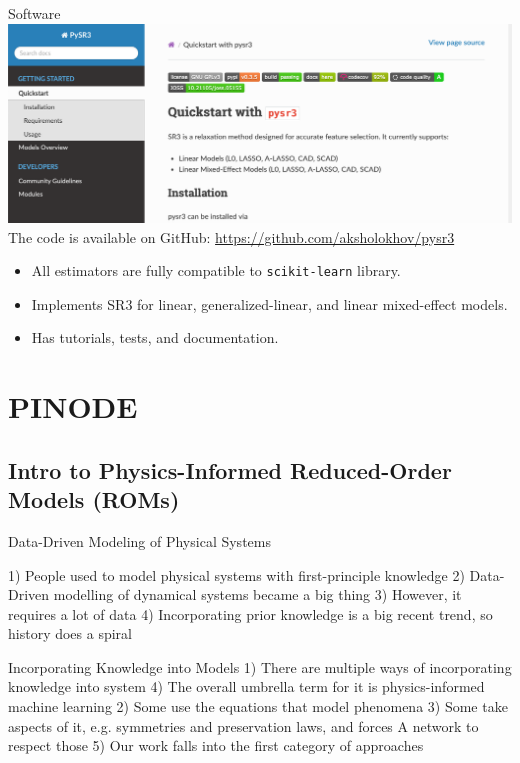 \documentclass[8pt]{beamer}
\begin{document}
\begin{frame}{Software}
	\includegraphics[width=\textwidth]{Figures/pysr3_screenshot.png}
	The code is available on GitHub: \href{github.com/aksholokhov/pysr3}{https://github.com/aksholokhov/pysr3}
	\begin{itemize}
		\item All estimators are fully compatible to \texttt{scikit-learn} library.
		\item Implements SR3 for linear, generalized-linear, and linear mixed-effect models.
		\item Has tutorials, tests, and documentation.
	\end{itemize}
\end{frame}

\section{PINODE}

\subsection{Intro to Physics-Informed Reduced-Order Models (ROMs)}

\begin{frame}{Data-Driven Modeling of Physical Systems}

1) People used to model physical systems with first-principle knowledge
2) Data-Driven modelling of dynamical systems became a big thing  
3) However, it requires a lot of data 
4) Incorporating prior knowledge is a big recent trend, so history does a spiral

\end{frame}


\begin{frame}{Incorporating Knowledge into Models}
1) There are multiple ways of incorporating knowledge into system 
4) The overall umbrella term for it is physics-informed machine learning
2) Some use the equations that model phenomena
3) Some take aspects of it, e.g. symmetries and preservation laws, and forces
A network to respect those
5) Our work falls into the first category of approaches
\end{frame}
\end{document}
